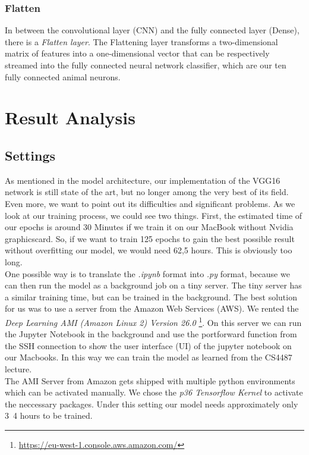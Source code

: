 \documentclass[journal]{IEEEtran}
\begin{document}
\subsubsection{Flatten}
In between the convolutional layer (CNN) and the fully connected layer (Dense), there is a \textit{Flatten layer}. The Flattening layer transforms a two-dimensional matrix of features into a one-dimensional vector that can be respectively streamed into the fully connected neural network classifier, which are our ten fully connected animal neurons. \\
%
%
\section{Result Analysis}
\subsection{Settings}
As mentioned in the model architecture, our implementation of the VGG16 network is still state of the art, but no longer among the very best of its field. Even more, we want to point out its difficulties and significant problems. As we look at our training process, we could see two things. First, the estimated time of our epochs is around 30 Minutes if we train it on our MacBook without Nvidia graphicscard. So, if we want to train 125 epochs to gain the best possible result without overfitting our model, we would need 62,5 hours. This is obviously too long. \\ One possible way is to translate the \textit{.ipynb} format into \textit{.py} format, because we can then run the model as a background job on a tiny server. The tiny server has a similar training time, but can be trained in the background. 
The best solution for us was to use a server from the Amazon Web Services (AWS). We rented the \textit{Deep Learning AMI (Amazon Linux 2) Version 26.0} \footnote{\href{https://eu-west-1.console.aws.amazon.com/}{https://eu-west-1.console.aws.amazon.com/}}. On this server we can run the Jupyter Notebook in the background and use the portforward function from the SSH connection to show the user interface (UI) of the jupyter notebook on our Macbooks. In this way we can train the model as learned from the CS4487 lecture. \\
The AMI Server from Amazon gets shipped with multiple python environments which can be activated manually. We chose the \textit{p36 Tensorflow Kernel} to activate the neccessary packages.
Under this setting our model needs approximately only 3~4 hours to be trained. \\ 
\end{document}
